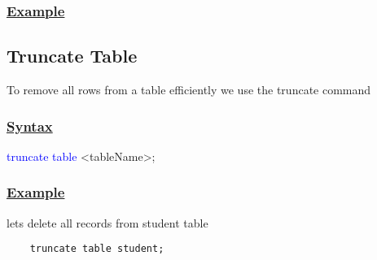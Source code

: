 \subsubsection*{\underline{Example}}
\subsection{Truncate Table}
\begin{tcolorbox}[title = Definition]
    To remove all rows from a table efficiently we use the truncate command
\end{tcolorbox}

\subsubsection*{\underline{Syntax}}
\begin{tcolorbox}[title = Truncing Table]
\textcolor{blue}{truncate table} \textless tableName\textgreater;
\end{tcolorbox}

\subsubsection*{\underline{Example}}
lets delete all records from student table
\begin{lstlisting}
    truncate table student;
\end{lstlisting}
